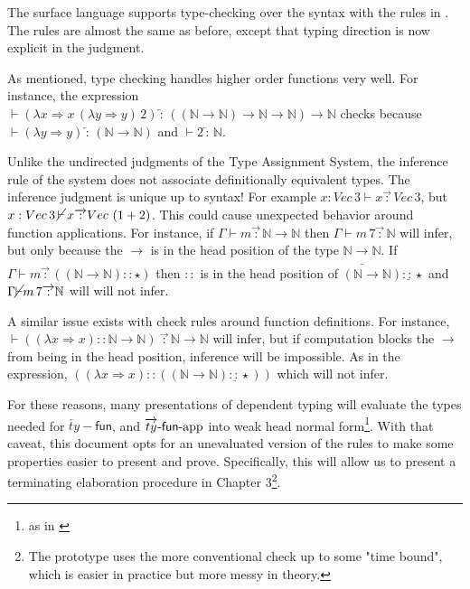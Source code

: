 The surface language supports \bidir{} type-checking over the syntax with the rules in .
The rules are almost the same as before, except that typing direction is now explicit in the judgment.
 
As mentioned, \bidir{} type checking handles higher order functions very well.
For instance, the expression $\vdash(\lambda x\Rightarrow x\,(\lambda y\Rightarrow y)\,2)\overleftarrow{\,:\,}\left(\left(\mathbb{N}\rightarrow\mathbb{N}\right)\rightarrow\mathbb{N}\rightarrow\mathbb{N}\right)\rightarrow\mathbb{N}$ checks because $\vdash(\lambda y\Rightarrow y)\overleftarrow{\,:\,}\left(\mathbb{N}\rightarrow\mathbb{N}\right)$ and $\vdash2\overleftarrow{\,:\,}\mathbb{N}$.
 
Unlike the undirected judgments of the Type Assignment System, the inference rule of the \bidir{} system does not associate definitionally equivalent types.
The inference judgment is unique up to syntax!
For example $x:Vec\,3\vdash x\overrightarrow{\,:\,}Vec\,3$, but $x:Vec\,3\, \cancel{\vdash}\, x\overrightarrow{\,:\,}Vec\,\left(1+2\right)$.
This could cause unexpected behavior around function applications.
For instance, if $\Gamma\vdash m\overrightarrow{\,:\,}\mathbb{N}\rightarrow\mathbb{N}$ then $\Gamma\vdash m\,7\overrightarrow{\,:\,}\mathbb{N}$ will infer, but only because the $\rightarrow$ is in the head position of the type $\mathbb{N}\underline{\rightarrow}\mathbb{N}$.
If $\Gamma\vdash m\overrightarrow{\,:\,}\left((\mathbb{N}\rightarrow\mathbb{N})::\star\right)$ then $::$ is in the head position of $(\mathbb{N}\rightarrow\mathbb{N})\underline{::}\star$ and $\Gamma\cancel{\vdash}m\,7\overrightarrow{\,:\,}\mathbb{N}$ will will not infer.
 
A similar issue exists with check rules around function definitions.
For instance, $\vdash\left((\lambda x\Rightarrow x)::\mathbb{N}\rightarrow\mathbb{N}\right)\ \overrightarrow{\,:\,}\mathbb{N}\rightarrow\mathbb{N}$ will infer, but if computation blocks the $\rightarrow$ from being in the head position, inference will be impossible.
As in the expression, $\left((\lambda x\Rightarrow x)::\left((\mathbb{N}\rightarrow\mathbb{N})\underline{::}\star\right)\right)$ which will not infer.
 
For these reasons, many presentations of \bidir{} dependent typing will evaluate the types needed for $\overleftarrow{ty}-\mathsf{fun}$, and $\operatorname{\overrightarrow{ty}-\mathsf{fun}-app}$ into weak head normal form\footnote{as in \cite{COQUAND1996167}}.
With that caveat, this document opts for an unevaluated version of the rules to make some properties easier to present and prove.
Specifically, this will allow us to present a terminating elaboration procedure in Chapter 3\footnote{
  The prototype uses the more conventional \whnf{} check up to some "time bound", which is easier in practice but more messy in theory.
}.
 
